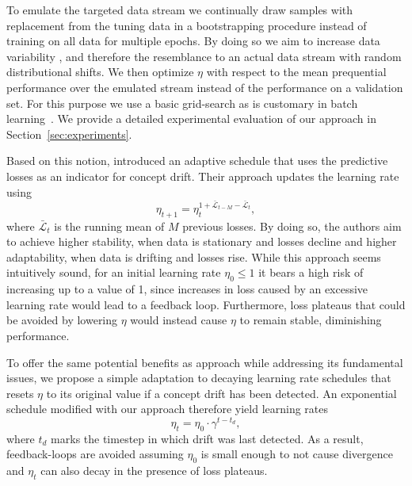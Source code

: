 \documentclass[letterpaper]{article} %
\begin{document}
To emulate
the targeted data stream we continually draw samples with replacement from the tuning data in a bootstrapping procedure instead of training on all data for multiple epochs.
By doing so we aim to increase data variability%
, and therefore the resemblance to an actual data stream with random distributional shifts.
We then optimize $\eta$ with respect to the mean prequential performance over the emulated stream instead of the performance on a validation set.
For this purpose we use a basic grid-search as is customary in batch learning~\cite{defazioLearningRateFreeLearningDAdaptation2023a}.
We provide a detailed experimental evaluation of our approach in Section~\ref{sec:experiments}.



Based on this notion, \citet{kunchevaAdaptiveLearningRate2008} introduced an adaptive schedule that uses the predictive losses as an indicator for concept drift.
Their approach updates the learning rate using
\begin{equation}
	\eta_{t+1} = \eta_t^{1+	\bar{\mathcal{L}}_{t-M} - \bar{\mathcal{L}}_{t}},
\end{equation}
where $\bar{\mathcal{L}}_{t}$ is the running mean of $M$ previous losses.
By doing so, the authors aim to achieve higher stability, when data is stationary and losses decline and higher adaptability, when data is drifting and losses rise.
While this approach seems intuitively sound, for an initial learning rate $\eta_0 \leq 1$ it bears a high risk of increasing up to a value of 1, since increases in loss caused by an excessive learning rate would lead to a feedback loop.
Furthermore, loss plateaus that could be avoided by lowering $\eta$ would instead cause $\eta$ to remain stable, diminishing performance.

To offer the same potential benefits as \citet{kunchevaAdaptiveLearningRate2008} approach while addressing its fundamental issues, we propose a simple adaptation to decaying learning rate schedules that resets $\eta$ to its original value if a concept drift has been detected.
An exponential schedule modified with our approach therefore yield learning rates
\begin{equation}
	\eta_t = \eta_0 \cdot \gamma^{t-t_d},
\end{equation}\label{eq:drift_reset}
where $t_d$ marks the timestep in which drift was last detected.
As a result, feedback-loops are avoided assuming $\eta_0$ is small enough to not cause divergence and $\eta_t$ can also decay in the presence of loss plateaus.
\end{document}
